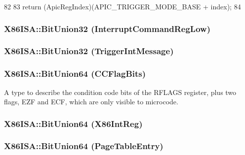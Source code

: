 \begin{DoxyCode}
82     {
83         return (ApicRegIndex)(APIC_TRIGGER_MODE_BASE + index);
84     }
\end{DoxyCode}
\hypertarget{namespaceX86ISA_a1c8b28eb3a1018e40f0dce9c3fcd7b39}{
\subsubsection[{BitUnion32}]{\setlength{\rightskip}{0pt plus 5cm}X86ISA::BitUnion32 (InterruptCommandRegLow)}}
\label{namespaceX86ISA_a1c8b28eb3a1018e40f0dce9c3fcd7b39}
\hypertarget{namespaceX86ISA_a178f2c509b14a166e93fd7104d0389b1}{
\subsubsection[{BitUnion32}]{\setlength{\rightskip}{0pt plus 5cm}X86ISA::BitUnion32 (TriggerIntMessage)}}
\label{namespaceX86ISA_a178f2c509b14a166e93fd7104d0389b1}
\hypertarget{namespaceX86ISA_add2763aec7e48b7f1017b5fe13442001}{
\subsubsection[{BitUnion64}]{\setlength{\rightskip}{0pt plus 5cm}X86ISA::BitUnion64 (CCFlagBits)}}
\label{namespaceX86ISA_add2763aec7e48b7f1017b5fe13442001}
A type to describe the condition code bits of the RFLAGS register, plus two flags, EZF and ECF, which are only visible to microcode. \hypertarget{namespaceX86ISA_a10715f66efb544706934aad138792efd}{
\subsubsection[{BitUnion64}]{\setlength{\rightskip}{0pt plus 5cm}X86ISA::BitUnion64 (X86IntReg)}}
\label{namespaceX86ISA_a10715f66efb544706934aad138792efd}
\hypertarget{namespaceX86ISA_ae28542c612a17a0204a7280bf2f19445}{
\subsubsection[{BitUnion64}]{\setlength{\rightskip}{0pt plus 5cm}X86ISA::BitUnion64 (PageTableEntry)}}
